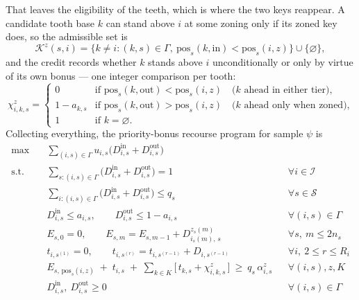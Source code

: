 \documentclass{article}
\begin{document}
That leaves the eligibility of the teeth, which is where the two keys reappear. A candidate tooth base $k$ can stand above $i$ at some zoning only if its zoned key does, so the admissible set is
\begin{equation}\label{eq:ap_bonus_teeth}
\mathcal{K}^{z}(s,i) = \big\{ k \neq i : (k,s) \in \Gamma, \ \mathrm{pos}_s(k, \mathrm{in}) < \mathrm{pos}_s(i,z) \big\} \cup \{\varnothing\},
\end{equation}
and the credit records whether $k$ stands above $i$ unconditionally or only by virtue of its own bonus --- one integer comparison per tooth:
\begin{equation}\label{eq:ap_bonus_credit}
\chi^{z}_{i,k,s} =
\begin{cases}
0 & \text{if } \mathrm{pos}_s(k, \mathrm{out}) < \mathrm{pos}_s(i,z) \quad \text{($k$ ahead in either tier),}\\
1 - a_{k,s} & \text{if } \mathrm{pos}_s(k, \mathrm{out}) > \mathrm{pos}_s(i,z) \quad \text{($k$ ahead only when zoned),}\\
1 & \text{if } k = \varnothing .
\end{cases}
\end{equation}
Collecting everything, the priority-bonus recourse program for sample $\psi$ is
\begin{align}
\max \quad & \sum_{(i,s) \in \Gamma} u_{i,s} \big( D^{\mathrm{in}}_{i,s} + D^{\mathrm{out}}_{i,s} \big) \label{pb:obj} \\
\textrm{s.t.} \quad
& \sum_{s : (i,s) \in \Gamma} \big( D^{\mathrm{in}}_{i,s} + D^{\mathrm{out}}_{i,s} \big) = 1 && \forall i \in \mathcal{I} \label{pb:assign} \\
& \sum_{i : (i,s) \in \Gamma} \big( D^{\mathrm{in}}_{i,s} + D^{\mathrm{out}}_{i,s} \big) \le q_s && \forall s \in \mathcal{S} \label{pb:cap} \\
& D^{\mathrm{in}}_{i,s} \le a_{i,s}, \qquad D^{\mathrm{out}}_{i,s} \le 1 - a_{i,s} && \forall (i,s) \in \Gamma \label{pb:tier} \\
& E_{s,0} = 0, \qquad E_{s,m} = E_{s,m-1} + D^{z_s(m)}_{i_s(m),\, s} && \forall s, \ m \le 2 n_s \label{pb:prefix} \\
& t_{i,s^{(1)}} = 0, \qquad t_{i,s^{(r)}} = t_{i,s^{(r-1)}} + D_{i,s^{(r-1)}} && \forall i, \ 2 \le r \le R_i \label{pb:tooth} \\
& E_{s,\, \mathrm{pos}_s(i,z)} \;+\; t_{i,s} \;+\; \sum_{k \in K} \big[\, t_{k,s} + \chi^{z}_{i,k,s} \,\big]
\ \ge\ q_s\, \alpha^{z}_{i,s} && \forall (i,s), z, K \label{eq:ap_bonus_comb} \\
& D^{\mathrm{in}}_{i,s}, \ D^{\mathrm{out}}_{i,s} \ge 0 && \forall (i,s) \in \Gamma \label{pb:domain}
\end{align}
\end{document}

